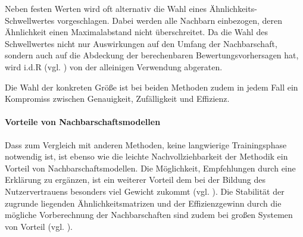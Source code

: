 Neben festen Werten wird oft alternativ die Wahl eines Ähnlichkeits-Schwellwertes vorgeschlagen. Dabei werden alle Nachbarn einbezogen, deren Ähnlichkeit einen Maximalabstand nicht überschreitet. Da die Wahl des Schwellwertes nicht nur Auswirkungen auf den Umfang der Nachbarschaft, sondern auch auf die Abdeckung der berechenbaren Bewertungsvorhersagen hat, wird i.d.R (vgl. \citep{Herlocker:2002:EAD:593967.594047, Herlocker:1999:AFP:312624.312682}) von der alleinigen Verwendung abgeraten.

Die Wahl der konkreten Größe ist bei beiden Methoden zudem in jedem Fall ein Kompromiss zwischen Genauigkeit, Zufälligkeit und Effizienz. 

\paragraph{Vorteile von Nachbarschaftsmodellen} Dass zum Vergleich mit anderen Methoden, keine langwierige Trainingsphase notwendig ist, ist  ebenso wie die leichte Nachvollziehbarkeit der  Methodik ein Vorteil von Nachbarschaftsmodellen. Die Möglichkeit, Empfehlungen durch eine Erklärung zu ergänzen, ist ein weiterer Vorteil dem bei der Bildung des Nutzervertrauens besonders viel Gewicht zukommt (vgl. \citep{hb_15}). Die Stabilität der zugrunde liegenden Ähnlichkeitsmatrizen und der Effizienzgewinn durch die mögliche Vorberechnung der Nachbarschaften sind zudem bei großen Systemen von Vorteil (vgl. \citep{linden03}).\citep{hb_04} 
